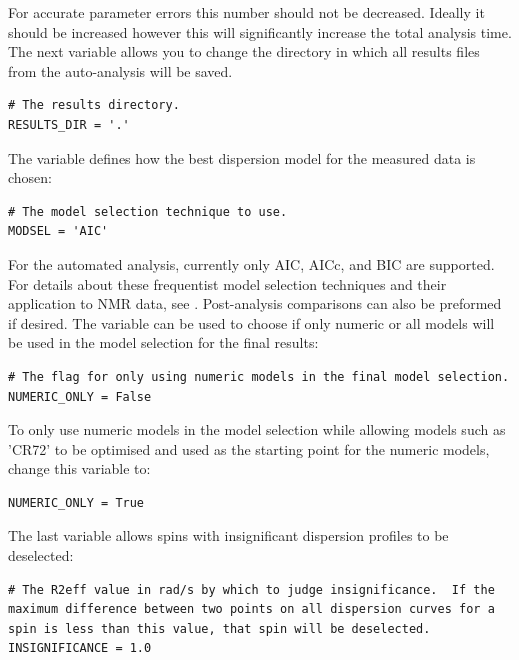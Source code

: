 For accurate parameter errors this number should not be decreased.
Ideally it should be increased however this will significantly increase the total analysis time.
The next variable allows you to change the directory in which all results files from the auto-analysis will be saved.

\begin{lstlisting}[firstnumber=23]
# The results directory.
RESULTS_DIR = '.'
\end{lstlisting}

The  variable defines how the best dispersion model for the measured data is chosen:

\begin{lstlisting}[firstnumber=26]
# The model selection technique to use.
MODSEL = 'AIC'
\end{lstlisting}

For the automated analysis, currently only AIC, AICc, and BIC are supported.
For details about these frequentist model selection techniques and their application to NMR data, see \citet{dAuvergneGooley03}.
Post-analysis comparisons can also be preformed if desired.
The  variable can be used to choose if only numeric or all models will be used in the model selection for the final results:

\begin{lstlisting}[firstnumber=29]
# The flag for only using numeric models in the final model selection.
NUMERIC_ONLY = False
\end{lstlisting}

To only use numeric models in the model selection while allowing models such as 'CR72' to be optimised and used as the starting point for the numeric models, change this variable to:

\begin{lstlisting}[numbers=none]
NUMERIC_ONLY = True
\end{lstlisting}

The last variable allows spins with insignificant dispersion profiles to be deselected:

\begin{lstlisting}[firstnumber=32]
# The R2eff value in rad/s by which to judge insignificance.  If the maximum difference between two points on all dispersion curves for a spin is less than this value, that spin will be deselected.
INSIGNIFICANCE = 1.0
\end{lstlisting}

